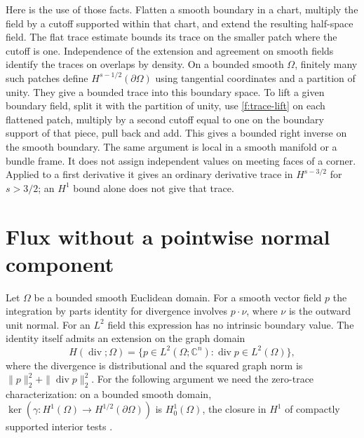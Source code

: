 Here is the use of those facts. Flatten a smooth boundary in a chart, multiply the field by a cutoff supported within that chart, and extend the resulting half-space field. The flat trace estimate bounds its trace on the smaller patch where the cutoff is one. Independence of the extension and agreement on smooth fields identify the traces on overlaps by density. On a bounded smooth $\Omega$, finitely many such patches define $H^{s-1/2}(\partial\Omega)$ using tangential coordinates and a partition of unity. They give a bounded trace into this boundary space. To lift a given boundary field, split it with the partition of unity, use \eqref{f:trace-lift} on each flattened patch, multiply by a second cutoff equal to one on the boundary support of that piece, pull back and add. This gives a bounded right inverse on the smooth boundary. The same argument is local in a smooth manifold or a bundle frame. It does not assign independent values on meeting faces of a corner. Applied to a first derivative it gives an ordinary derivative trace in $H^{s-3/2}$ for $s>3/2$; an $H^1$ bound alone does not give that trace.

\section{Flux without a pointwise normal component}\label{f:normal-flux}

Let $\Omega$ be a bounded smooth Euclidean domain. For a smooth vector field $p$ the integration by parts identity for divergence involves $p\cdot\nu$, where $\nu$ is the outward unit normal. For an $L^2$ field this expression has no intrinsic boundary value. The identity itself admits an extension on the graph domain
\[
 H(\operatorname{div};\Omega)=\{p\in L^2(\Omega;\mathbb C^n):\operatorname{div}p\in L^2(\Omega)\},
\]
where the divergence is distributional and the squared graph norm is $\|p\|_2^2+\|\operatorname{div}p\|_2^2$. For the following argument we need the zero-trace characterization: on a bounded smooth domain, $\ker(\gamma:H^1(\Omega)\to H^{1/2}(\partial\Omega))$ is $H^1_0(\Omega)$, the closure in $H^1$ of compactly supported interior tests \cite[\S5.5, trace-zero theorem]{Evans}.

